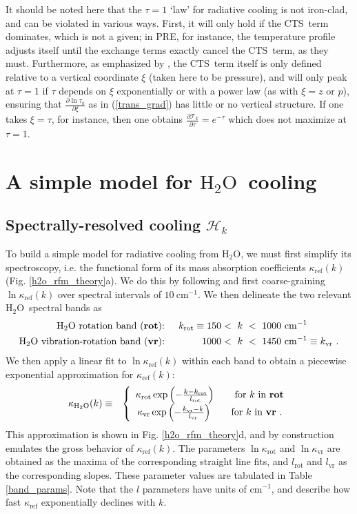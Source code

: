 \documentclass{ametsoc}
\newcommand{\beqa}{\begin{eqnarray}}
\newcommand{\eeqa}{\end{eqnarray}}
\newcommand{\eqnref}[1]{(\ref{#1})}
\newcommand{\cminverse}{\ensuremath{\mathrm{cm^{-1}}}}
\newcommand{\partialder}[2]{\ensuremath{\frac{\partial #1}{\partial #2}}}
\newcommand{\htwo}{\ensuremath{\mathrm{H_2O}}}
\newcommand{\trans}{\ensuremath{\mathcal{T}}}
\newcommand{\ch}{\ensuremath{\mathcal{H}}}
\newcommand{\chk}{\ensuremath{\ch_k}}
\newcommand{\tauk}{\ensuremath{\tau_k}}
\newcommand{\CTS}{\ensuremath{\mathrm{CTS}}}
\newcommand{\kapparef}{\ensuremath{\kappa_{\mathrm{ref}}}}
\newcommand{\kapparot}{\ensuremath{\kappa_{\mathrm{rot}}}}
\newcommand{\kappavr}{\ensuremath{\kappa_{\mathrm{vr}}}}
\newcommand{\krot}{\ensuremath{k_\mathrm{rot}}}
\newcommand{\kvr}{\ensuremath{k_\mathrm{vr}}}
\newcommand{\lrot}{\ensuremath{l_\mathrm{rot}}}
\newcommand{\lvr}{\ensuremath{l_\mathrm{vr}}}
\begin{document}
 It should be noted here that the $\tau=1$ `law' for radiative cooling is not iron-clad, and can be violated in various ways. First, it will only hold if the \CTS\ term dominates, which is not a given; in PRE, for instance, the temperature profile adjusts itself until the exchange terms exactly cancel the \CTS\ term, as they must. Furthermore,  as emphasized by \cite{huang2014}, the \CTS\ term itself is only defined relative to a vertical coordinate $\xi$ (taken here to be pressure),  and  will only peak at $\tau=1$ if $\tau$ depends on $\xi$ exponentially or with a power law (as with $\xi=z$ or $p$), ensuring that $\partialder{\ln \tauk}{\xi}$ as in \eqnref{trans_grad} has little or no vertical structure. If one takes $\xi=\tau$, for instance, then one obtains $\partialder{\trans_k}{\tau} = e^{-\tau}$ which does not maximize at $\tau=1$. 
 
\section{A simple model for  \htwo\ cooling} \label{sec_h2o_theory}

\subsection{Spectrally-resolved cooling \chk} \label{sec_h2o_spectral}
To build a simple model for radiative cooling from \htwo,  we must first simplify its spectroscopy, i.e. the functional form of its mass absorption coefficients $\kapparef(k)$ (Fig. \ref{h2o_rfm_theory}a). We do this by following \cite{wilson2012} and first coarse-graining $\ln \kapparef(k)$ over spectral intervals of $10 \ \cminverse$. We then delineate the two relevant \htwo\ spectral bands as
\beqa
	\begin{split}
	    	\text{\htwo\ rotation band (\textbf{rot}): } & & \krot \equiv 150 & <\  k\  < \ 1000\ \cminverse \\
    		\text{\htwo\ vibration-rotation band (\textbf{vr}): } & &  1000 & < \  k\ <\  1450\ \cminverse \equiv \kvr   \ .
	\end{split}
	\label{h2o_bands}
\eeqa
 We then apply a linear fit to $\ln \kapparef(k)$ within each band  to obtain a piecewise exponential approximation for $\kapparef(k)$:
 \beqa
 	\kappa_{\htwo}(k) & \equiv & \left\{ \begin{array}{cr} 
													\kapparot \exp\left(-\frac{k-\krot}{\lrot}\right) \quad \quad \text{for $k$ in \textbf{rot}}  \\
												    \kappavr \exp\left(-\frac{\kvr-k}{\lvr}\right)   \quad \quad \text{for $k$ in \textbf{vr} .}
												      \end{array} \right.          
\label{kappa_h2o}
 \eeqa
This approximation is shown in Fig. \ref{h2o_rfm_theory}d, and by construction emulates the gross behavior of $\kapparef(k)$. The parameters $\ln\kapparot$ and $\ln \kappavr$ are obtained as the maxima of the corresponding straight line fits, and $\lrot$ and $\lvr$ as the corresponding slopes. These parameter values are tabulated in Table \ref{band_params}. Note that the $l$ parameters have units of \cminverse, and describe how fast $\kapparef$ exponentially declines with $k$.
 
\end{document}
